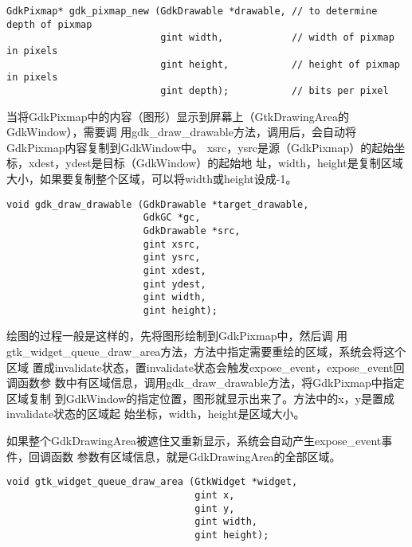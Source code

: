\begin{shell}
\begin{verbatim}
GdkPixmap* gdk_pixmap_new (GdkDrawable *drawable, // to determine depth of pixmap
                           gint width,            // width of pixmap in pixels
                           gint height,           // height of pixmap in pixels
                           gint depth);           // bits per pixel
\end{verbatim}
\end{shell}

当将GdkPixmap中的内容（图形）显示到屏幕上（GtkDrawingArea的GdkWindow），需要调
用gdk\_draw\_drawable方法，调用后，会自动将GdkPixmap内容复制到GdkWindow中。
xsrc，ysrc是源（GdkPixmap）的起始坐标，xdest，ydest是目标（GdkWindow）的起始地
址，width，height是复制区域大小，如果要复制整个区域，可以将width或height设成-1。

\begin{shell}
\begin{verbatim}
void gdk_draw_drawable (GdkDrawable *target_drawable,
                        GdkGC *gc,
                        GdkDrawable *src,
                        gint xsrc,
                        gint ysrc,
                        gint xdest,
                        gint ydest,
                        gint width,
                        gint height);
\end{verbatim}
\end{shell}

绘图的过程一般是这样的，先将图形绘制到GdkPixmap中，然后调
用gtk\_widget\_queue\_draw\_area方法，方法中指定需要重绘的区域，系统会将这个区域
置成invalidate状态，置invalidate状态会触发expose\_event，expose\_event回调函数参
数中有区域信息，调用gdk\_draw\_drawable方法，将GdkPixmap中指定区域复制
到GdkWindow的指定位置，图形就显示出来了。方法中的x，y是置成invalidate状态的区域起
始坐标，width，height是区域大小。

如果整个GdkDrawingArea被遮住又重新显示，系统会自动产生expose\_event事件，回调函数
参数有区域信息，就是GdkDrawingArea的全部区域。

\begin{shell}
\begin{verbatim}
void gtk_widget_queue_draw_area (GtkWidget *widget,
                                 gint x,
                                 gint y,
                                 gint width,
                                 gint height);
\end{verbatim}
\end{shell}
